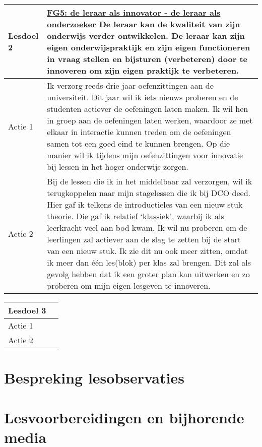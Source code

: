 \documentclass[a4paper,12pt,twoside]{article}%
\begin{document}
\vspace{0.5cm}
\begin{tabularx}{\textwidth}{|p{}|p{}|}
\hline
\textbf{Lesdoel 2} & \underline{FG5:  de leraar als innovator - de leraar als onderzoeker}\newline
5.1 De leraar kan de kwaliteit van zijn onderwijs verder ontwikkelen. De leraar kan zijn eigen onderwijspraktijk en zijn eigen functioneren in vraag stellen en bijsturen (verbeteren) door te innoveren om zijn eigen praktijk te verbeteren.\\ \hline
Actie 1 & Ik verzorg reeds drie jaar oefenzittingen aan de universiteit. Dit jaar wil ik iets nieuws proberen en de studenten actiever de oefeningen laten maken. Ik wil hen in groep aan de oefeningen laten werken, waardoor ze met elkaar in interactie kunnen treden om de oefeningen samen tot een goed eind te kunnen brengen. Op die manier wil ik tijdens mijn oefenzittingen voor innovatie bij lessen in het hoger onderwijs zorgen. \\ \hline
Actie 2 & Bij de lessen die ik in het middelbaar zal verzorgen, wil ik terugkoppelen naar mijn stagelessen die ik bij DCO deed. Hier gaf ik telkens de introductieles van een nieuw stuk theorie. Die gaf ik relatief `klassiek', waarbij ik als leerkracht veel aan bod kwam. Ik wil nu proberen om de leerlingen zal actiever aan de slag te zetten bij de start van een nieuw stuk. Ik zie dit nu ook meer zitten, omdat ik meer dan één les(blok) per klas zal brengen. Dit zal als gevolg hebben dat ik een groter plan kan uitwerken en zo proberen om mijn eigen lesgeven te innoveren.    \\ \hline
\end{tabularx}

\vspace{0.5cm}
\begin{tabularx}{\textwidth}{|p{}|p{}|}
\hline
\textbf{Lesdoel 3} & \\ \hline
Actie 1 & \\ \hline
Actie 2 & \\ \hline
\end{tabularx}


\section{Bespreking lesobservaties}

\section{Lesvoorbereidingen en bijhorende media}
\end{document}
